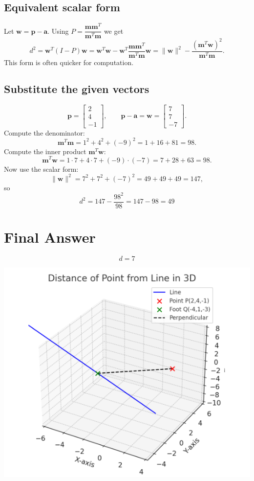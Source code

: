 \documentclass[journal]{IEEEtran}
\begin{document}
\subsection*{Equivalent scalar form}
Let \(\mathbf w=\mathbf p-\mathbf a\). Using \(P=\dfrac{\mathbf m\mathbf m^{T}}{\mathbf m^{T}\mathbf m}\) we get
\begin{equation}
d^{2}=\mathbf w^{T}(I-P)\mathbf w
= \mathbf w^{T}\mathbf w - \mathbf w^{T}\frac{\mathbf m\mathbf m^{T}}{\mathbf m^{T}\mathbf m}\mathbf w
= \lVert\mathbf w\rVert^{2} - \frac{(\mathbf m^{T}\mathbf w)^{2}}{\mathbf m^{T}\mathbf m}.
\end{equation}
This form is often quicker for computation.

\subsection*{Substitute the given vectors}
\begin{equation}
\mathbf p=\begin{bmatrix}2\\[2pt]4\\[2pt]-1\end{bmatrix},\qquad
\mathbf p-\mathbf a=\mathbf w=\begin{bmatrix}7\\[2pt]7\\[2pt]-7\end{bmatrix}.
\end{equation}
Compute the denominator:
\begin{equation}
\mathbf m^{T}\mathbf m = 1^{2}+4^{2}+(-9)^{2}=1+16+81=98.
\end{equation}
Compute the inner product \(\mathbf m^{T}\mathbf w\):
\begin{equation}
\mathbf m^{T}\mathbf w = 1\cdot 7 + 4\cdot 7 + (-9)\cdot(-7) = 7+28+63=98.
\end{equation}
Now use the scalar form:
\begin{equation}
\lVert\mathbf w\rVert^{2} = 7^{2}+7^{2}+(-7)^{2}=49+49+49=147,
\end{equation}
so
\begin{equation}
d^{2}=147-\frac{98^{2}}{98}=147-98=49
\end{equation}

\section*{Final Answer}
\[
\boxed{\,d=7\,}
\]

\begin{center}
    \includegraphics[width=0.8\columnwidth]{figs/plot7.png}
\end{center}
\end{document}
